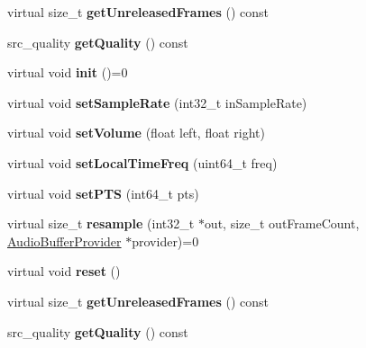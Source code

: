 \begin{DoxyCompactItemize}
virtual size\+\_\+t {\bfseries get\+Unreleased\+Frames} () const
\item 
\mbox{\label{classcocos2d_1_1experimental_1_1AudioResampler_a88b5f754bfbf2f2267c0729f07d90440}} 
src\+\_\+quality {\bfseries get\+Quality} () const
\item 
\mbox{\label{classcocos2d_1_1experimental_1_1AudioResampler_ab6e34a6d25d51219781fcbcbd6e89c91}} 
virtual void {\bfseries init} ()=0
\item 
\mbox{\label{classcocos2d_1_1experimental_1_1AudioResampler_a8ec11109831694c3d491630a0f818172}} 
virtual void {\bfseries set\+Sample\+Rate} (int32\+\_\+t in\+Sample\+Rate)
\item 
\mbox{\label{classcocos2d_1_1experimental_1_1AudioResampler_a77c019a6da1111cc06540c5801ee2c6c}} 
virtual void {\bfseries set\+Volume} (float left, float right)
\item 
\mbox{\label{classcocos2d_1_1experimental_1_1AudioResampler_a86b42735d1626b099f81b463c4cff727}} 
virtual void {\bfseries set\+Local\+Time\+Freq} (uint64\+\_\+t freq)
\item 
\mbox{\label{classcocos2d_1_1experimental_1_1AudioResampler_a2b479933250a71f2f77f9189e317a8a6}} 
virtual void {\bfseries set\+P\+TS} (int64\+\_\+t pts)
\item 
\mbox{\label{classcocos2d_1_1experimental_1_1AudioResampler_a045a9dd73f86c9d1b766b63ab2de3c14}} 
virtual size\+\_\+t {\bfseries resample} (int32\+\_\+t $\ast$out, size\+\_\+t out\+Frame\+Count, \hyperlink{classcocos2d_1_1experimental_1_1AudioBufferProvider}{Audio\+Buffer\+Provider} $\ast$provider)=0
\item 
\mbox{\label{classcocos2d_1_1experimental_1_1AudioResampler_a7f61ae0586b5dfc517e6589b741ef05d}} 
virtual void {\bfseries reset} ()
\item 
\mbox{\label{classcocos2d_1_1experimental_1_1AudioResampler_a3ef3b1d29fe9bf3df48514af9166c4d6}} 
virtual size\+\_\+t {\bfseries get\+Unreleased\+Frames} () const
\item 
\mbox{\label{classcocos2d_1_1experimental_1_1AudioResampler_a88b5f754bfbf2f2267c0729f07d90440}} 
src\+\_\+quality {\bfseries get\+Quality} () const
\end{DoxyCompactItemize}
